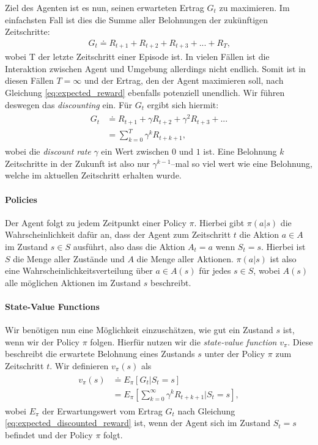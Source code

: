 Ziel des Agenten ist es nun, seinen erwarteten Ertrag $ G_t $ zu maximieren. Im einfachsten Fall ist dies die Summe aller Belohnungen der zukünftigen Zeitschritte:
\begin{align}
    G_t \doteq R_{t + 1} + R_{t + 2} + R_{t + 3} + ... + R_T \text{,} \label{eq:expected_reward}
\end{align}
wobei T der letzte Zeitschritt einer Episode ist. In vielen Fällen ist die Interaktion zwischen Agent und Umgebung allerdings nicht endlich. Somit ist in diesen Fällen $ T = \infty $ und der Ertrag, den der Agent maximieren soll, nach Gleichung \ref{eq:expected_reward} ebenfalls potenziell unendlich. Wir führen deswegen das \textit{discounting} ein. Für $ G_t $ ergibt sich hiermit:
\begin{align}
    \begin{split}
        G_t & \doteq R_{t + 1} + \gamma R_{t + 2} + \gamma^2 R_{t + 3} + ...\\
        & = \sum_{k = 0}^{T} \gamma^k R_{t + k + 1} \text{,}
    \end{split} \label{eq:expected_discounted_reward}
\end{align}
wobei die \textit{discount rate} $ \gamma $ ein Wert zwischen $ 0 $ und $ 1 $ ist. Eine Belohnung $ k $ Zeitschritte in der Zukunft ist also nur $ \gamma^{k - 1} $--mal so viel wert wie eine Belohnung, welche im aktuellen Zeitschritt erhalten wurde.

\paragraph{Policies}
Der Agent folgt zu jedem Zeitpunkt einer Policy $ \pi $. Hierbei gibt $ \pi(a|s) $ die Wahrscheinlichkeit dafür an, dass der Agent zum Zeitschritt $ t $ die Aktion $ a \in A $ im Zustand $ s \in S $ ausführt, also dass die Aktion $ A_t = a $ wenn $ S_t = s $. Hierbei ist $ S $ die Menge aller Zustände und $ A $ die Menge aller Aktionen. $ \pi(a|s) $ ist also eine Wahrscheinlichkeitsverteilung über $ a \in A(s) $ für jedes $ s \in S $, wobei $ A(s) $ alle möglichen Aktionen im Zustand $ s $ beschreibt.

\paragraph{State-Value Functions}
Wir benötigen nun eine Möglichkeit einzuschätzen, wie gut ein Zustand $ s $ ist, wenn wir der Policy $ \pi $ folgen. Hierfür nutzen wir die \textit{state-value function} $ v_\pi $. Diese beschreibt die erwartete Belohnung eines Zustands $ s $ unter der Policy $ \pi $ zum Zeitschritt $ t $. Wir definieren $ v_\pi(s) $ als
\begin{align}
    \begin{split}
    v_\pi(s) & \doteq E_\pi \left[G_t | S_t = s \right]\\
    & = E_\pi \left[\sum_{k = 0}^{\infty} \gamma^k R_{t + k + 1} | S_t = s \right],
    \end{split}
\end{align}
wobei $ E_\pi $ der Erwartungswert vom Ertrag $ G_t $ nach Gleichung \ref{eq:expected_discounted_reward} ist, wenn der Agent sich im Zustand $ S_t = s $ befindet und der Policy $ \pi $ folgt.

